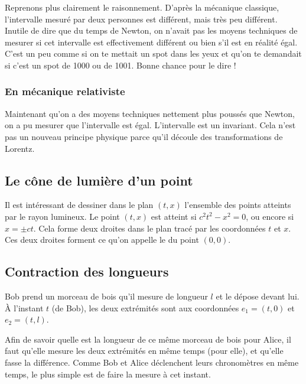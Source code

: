 Reprenons plus clairement le raisonnement. D'après la mécanique classique, l'intervalle mesuré par deux personnes est différent, mais très peu différent. Inutile de dire que du temps de Newton, on n'avait pas les moyens techniques de mesurer si cet intervalle est effectivement différent ou bien s'il est en réalité égal. C'est un peu comme si on te mettait un spot dans les yeux et qu'on te demandait si c'est un spot de \unit{1000}{\watt} ou de \unit{1001}{\watt}. Bonne chance pour le dire !

\subsubsection{En mécanique relativiste}

 Maintenant qu'on a des moyens techniques nettement plus poussés que Newton, on a pu mesurer que l'intervalle est égal. L'intervalle est un invariant. Cela n'est pas un nouveau principe physique parce qu'il découle des transformations de Lorentz.


\subsection{Le cône de lumière d'un point}


Il est intéressant de dessiner dans le plan $(t,x)$ l'ensemble des points atteints par le rayon lumineux. Le point $(t,x)$ est atteint si $c^2t^2-x^2=0$, ou encore si $x=\pm ct$. Cela forme deux droites dans le plan tracé par les coordonnées $t$ et $x$. Ces deux droites forment ce qu'on appelle le  du point $(0,0)$.

\subsection{Contraction des longueurs}

Bob prend un morceau de bois qu'il mesure de longueur $l$ et le dépose devant lui. À l'instant $t$ (de Bob), les deux extrémités sont aux coordonnées $e_1=(t,0)$ et $e_2=(t,l)$. 

Afin de savoir quelle est la longueur de ce même morceau de bois pour Alice, il faut qu'elle mesure les deux extrémités en même temps (pour elle), et qu'elle fasse la différence. Comme Bob et Alice déclenchent leurs chronomètres en même temps, le plus simple est de faire la mesure à cet instant.

